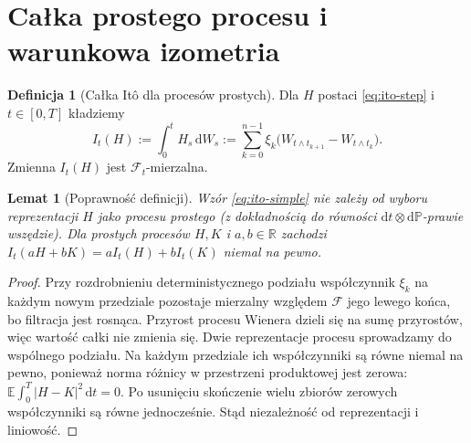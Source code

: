 \documentclass[11pt,a4paper,oneside]{report}
\numberwithin{equation}{chapter}
\theoremstyle{plain}
\newtheorem{lemat}[twierdzenie]{Lemat}
\theoremstyle{definition}
\newtheorem{definicja}{Definicja}[chapter]
\theoremstyle{remark}
\newcommand{\R}{\mathbb{R}}
\newcommand{\Prob}{\mathbb{P}}
\newcommand{\E}{\mathbb{E}}
\newcommand{\calF}{\mathcal{F}}
\newcommand{\dd}{\mathrm{d}}
\begin{document}
\section{Całka prostego procesu i warunkowa izometria}\label{sec:volIII:02:02}
\begin{definicja}[Całka Itô dla procesów prostych]\label{def:volIII:02:02}
Dla $H$ postaci \eqref{eq:ito-step} i $t\in[0,T]$ kładziemy
\[
I_t(H):=\int_0^t H_s\,\dd W_s
:=\sum_{k=0}^{n-1}\xi_k
\big(W_{t\wedge t_{k+1}}-W_{t\wedge t_k}\big).
\tag{2.2}\label{eq:ito-simple}
\]
Zmienna $I_t(H)$ jest $\calF_t$-mierzalna.
\end{definicja}

\begin{lemat}[Poprawność definicji]\label{lem:volIII:02:01}
Wzór \eqref{eq:ito-simple} nie zależy od wyboru
reprezentacji $H$ jako procesu prostego (z dokładnością
do równości $\dd t\otimes\dd\Prob$-prawie wszędzie).
Dla prostych procesów $H,K$ i $a,b\in\R$ zachodzi
$I_t(aH+bK)=aI_t(H)+bI_t(K)$ niemal na pewno.
\end{lemat}
\begin{proof}
Przy rozdrobnieniu deterministycznego podziału współczynnik
$\xi_k$ na każdym nowym przedziale pozostaje mierzalny
względem $\calF$ jego lewego końca, bo filtracja jest rosnąca.
Przyrost procesu Wienera dzieli się na sumę przyrostów,
więc wartość całki nie zmienia się. Dwie reprezentacje
procesu sprowadzamy do wspólnego podziału. Na każdym
przedziale ich współczynniki są równe niemal na pewno,
ponieważ norma różnicy w przestrzeni produktowej jest zerowa:
$\E\int_0^T|H-K|^2\,\dd t=0$.
Po usunięciu skończenie wielu zbiorów zerowych
współczynniki są równe jednocześnie. Stąd niezależność
od reprezentacji i liniowość.
\end{proof}
\end{document}
